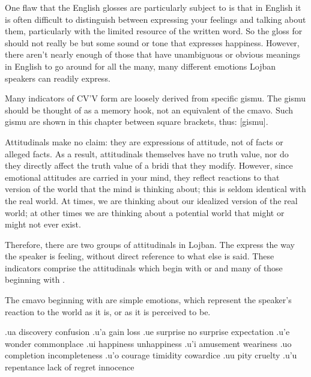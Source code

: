 One flaw that the English glosses are particularly subject
    to is that in English it is often difficult to distinguish
    between expressing your feelings and talking about them,
    particularly with the limited resource of the written word. So
    the gloss for  should not really be  but
    some sound or tone that expresses happiness. However, there
    aren't nearly enough of those that have unambiguous or obvious
    meanings in English to go around for all the many, many
    different emotions Lojban speakers can readily express.

Many indicators of CV'V form are loosely derived from
    specific gismu. The gismu should be thought of as a memory
    hook, not an equivalent of the cmavo. Such gismu are shown in
    this chapter between square brackets, thus: [gismu].



Attitudinals make no claim: they are expressions of
    attitude, not of facts or alleged facts. As a result,
    attitudinals themselves have no truth value, nor do they
    directly affect the truth value of a bridi that they modify.
    However, since emotional attitudes are carried in your mind,
    they reflect reactions to that version of the world that the
    mind is thinking about; this is seldom identical with the real
    world. At times, we are thinking about our idealized version of
    the real world; at other times we are thinking about a
    potential world that might or might not ever exist.

Therefore, there are two groups of attitudinals in Lojban.
    The  express the way the speaker is
    feeling, without direct reference to what else is said. These
    indicators comprise the attitudinals which begin with  or
     and many of those beginning with .

The cmavo beginning with  are simple emotions, which
    represent the speaker's reaction to the world as it is, or as
    it is perceived to be.

   .ua discovery           confusion
    .u'a    gain                loss
    .ue surprise    no surprise expectation
    .u'e    wonder              commonplace
    .ui happiness           unhappiness
    .u'i    amusement           weariness
    .uo completion          incompleteness
    .u'o    courage     timidity    cowardice
    .uu     pity                cruelty
    .u'u    repentance  lack of regret  innocence

